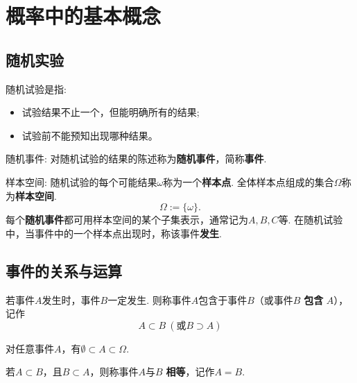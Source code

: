 
\usepackage{ctex}



% 

\section{概率中的基本概念}

\subsection{随机实验}

\begin{definition}
    随机试验是指: 
    \begin{itemize}
        \item 试验结果不止一个，但能明确所有的结果; 
        \item 试验前不能预知出现哪种结果。
    \end{itemize}
\end{definition}

\begin{definition}
    随机事件: 对随机试验的结果的陈述称为\textbf{随机事件}，简称\textbf{事件}. 
\end{definition}

\begin{definition}
    样本空间: 随机试验的每个可能结果$\omega$称为一个\textbf{样本点}. 全体样本点组成的集合$\Omega$称为\textbf{样本空间}. 
    $$
        \Omega:=\{\omega\}.
    $$
    每个\textbf{随机事件}都可用样本空间的某个子集表示，通常记为$A, B, C$等. 
    在随机试验中，当事件中的一个样本点出现时，称该事件\textbf{发生}. 
\end{definition}

\subsection{事件的关系与运算}

\begin{definition}[事件的关系] 
    若事件$A$发生时，事件$B$一定发生. 则称事件$A$包含于事件$B$（或事件$B$ \textbf{包含} $A$），记作
    $$A\subset B \ (\text{或}B\supset A)$$

    对任意事件$A$，有$\emptyset \subset A\subset \Omega$. 

    若$A\subset B$，且$B\subset A$，则称事件$A$与$B$ \textbf{相等}，记作$A=B$. 
    
\end{definition}

